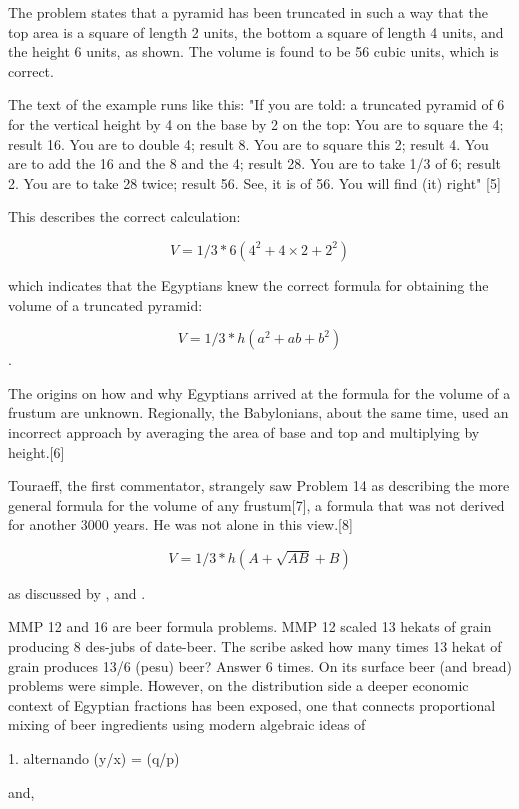 \documentclass[12pt]{article}
\begin{document}
The problem states that a pyramid has been truncated in such a way that the top area is a square of length 2 units, the bottom a square of length 4 units, and the height 6 units, as shown. The volume is found to be 56 cubic units, which is correct.

The text of the example runs like this: "If you are told: a truncated pyramid of 6 for the vertical height by 4 on the base by 2 on the top: You are to square the 4; result 16. You are to double 4; result 8. You are to square this 2; result 4. You are to add the 16 and the 8 and the 4; result 28. You are to take 1/3 of 6; result 2. You are to take 28 twice; result 56. See, it is of 56. You will find (it) right" [5]

This describes the correct calculation:

    $$V = 1/3*6(4^2 + 4 \times 2 +2^2)$$

which indicates that the Egyptians knew the correct formula for obtaining the volume of a truncated pyramid:

    $$V = 1/3*h(a^2 + ab + b^2)$$.

The origins on how and why Egyptians arrived at the formula for the volume of a frustum are unknown. Regionally, the Babylonians, about the same time, used an incorrect approach by averaging the area of base and top and multiplying by height.[6]

Touraeff, the first commentator, strangely saw Problem 14 as describing the more general formula for the volume of any frustum[7], a formula that was not derived for another 3000 years. He was not alone in this view.[8]

    $$V = 1/3*h(A+\sqrt{A B}+B)$$

as discussed by , and .

MMP 12 and 16 are beer formula problems. MMP 12 scaled 13 hekats of grain producing 8 des-jubs of date-beer. The scribe asked how many times 13 hekat of grain produces 13/6 (pesu) beer? Answer 6 times. On its surface beer (and bread) problems were simple. However, on the distribution side a deeper economic context of Egyptian fractions has been exposed, one that connects proportional mixing of beer ingredients using modern algebraic ideas of 

1. alternando (y/x) = (q/p) 

and,
\end{document}
